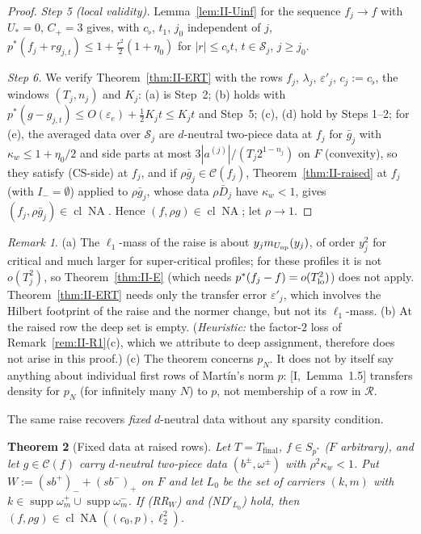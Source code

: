 \documentclass[10pt]{amsart}
\newtheorem{theorem}{Theorem}[section]
\theoremstyle{definition}
\theoremstyle{remark}
\newtheorem{remark}[theorem]{Remark}
\newcommand{\NA}{\operatorname{NA}}
\newcommand{\supp}{\operatorname{supp}}
\newcommand{\Cset}{\mathcal C}
\newcommand{\cl}{\operatorname{cl}}
\newcommand{\Rec}{\mathcal R}
\begin{document}
\begin{proof}
\emph{Step 5 (local validity).}  Lemma~\ref{lem:II-Uinf} for the sequence
$f_j\to f$ with $U_*=0$, $C_+=3$ gives, with $c_\flat$, $t_1$, $j_0$
independent of $j$, $p^*(f_j+rg_{j,t})\le1+\frac{r^2}2(1+\eta_0)$ for
$|r|\le c_\flat t$, $t\in\mathcal S_j$, $j\ge j_0$.

\emph{Step 6.}  We verify Theorem~\ref{thm:II-ERT} with the rows $f_j$,
$\lambda_j$, $\varepsilon'_j$, $c_j:=c_\flat$, the windows $(T_j,n_j)$ and $K_j$:
(a) is Step~2; (b) holds with $p^*(g-g_{j,t})\le O(\varepsilon_e)+\frac12K_jt\le
K_jt$ and Step~5; (c), (d) hold by Steps 1--2; for (e), the averaged data
over $\mathcal S_j$ are $d$-neutral two-piece data at $f_j$ for $\bar g_j$ with
$\kappa_w\le1+\eta_0/2$ and side parts at most $3|a^{(j)}|/(T_j2^{1-n_j})$ on
$F$ (convexity), so they satisfy (CS-side) at $f_j$, and if $\rho\bar g_j\in
\Cset(f_j)$, Theorem~\ref{thm:II-raised} at $f_j$ (with $I_-=\emptyset$) applied
to $\rho\bar g_j$, whose data $\rho\bar D_j$ have $\kappa_w<1$, gives
$(f_j,\rho\bar g_j)\in\cl\NA$.  Hence $(f,\rho g)\in\cl\NA$; let $\rho\to1$.
\end{proof}

\begin{remark}\label{rem:II-RS}
(a) The $\ell_1$-mass of the raise is about $y_jm_{U_{\rm np}}(y_j)$, of
order $y_j^2$ for critical and much larger for super-critical profiles; for
these profiles it is not $o(T_j^2)$, so Theorem~\ref{thm:II-E} (which needs $p^*(f_j-f)=
o(T_{\rm lo}^2)$) does not apply.  Theorem~\ref{thm:II-ERT} needs only the
transfer error $\varepsilon'_j$, which involves the Hilbert footprint of the
raise and the normer change, but not its $\ell_1$-mass.
(b) At the raised row the deep set is empty.  (\emph{Heuristic:} the
factor-$2$ loss of Remark~\ref{rem:II-R1}(c), which we attribute to deep
assignment, therefore does not arise in this proof.)
(c) The theorem concerns $p_N$.  It does not by itself say anything about
individual first rows of Mart\'in's norm $p$: [I,~Lemma~1.5] transfers density
for $p_N$ (for infinitely many $N$) to $p$, not membership of a row in $\Rec$.
\end{remark}

The same raise recovers \emph{fixed} $d$-neutral data without any sparsity
condition.

\begin{theorem}[Fixed data at raised rows]\label{thm:II-A}
Let $T=T_{\mathrm{final}}$, $f\in S_{p^*}$ \textup{(}$F$ arbitrary\textup{)},
and let $g\in\Cset(f)$ carry $d$-neutral two-piece data $(b^\pm,\omega^\pm)$
with $\rho^2\kappa_w<1$.  Put $W:=(sb^+)_-+(sb^-)_+$ on $F$ and let $L_0$ be
the set of carriers $(k,m)$ with $k\in\supp\omega^+_m\cup\supp\omega^-_m$.  If
\textup{(RR$_W$)} and \textup{(ND$'_{L_0}$)} hold, then
$(f,\rho g)\in\cl\NA((c_0,p),\ell_2^2)$.
\end{theorem}
\end{document}
